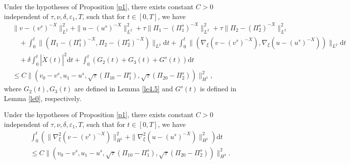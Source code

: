 \documentclass[10pt,a4paper]{amsart}
\newcommand{\dif}{\mathrm{d}}
\begin{document}
\begin{corollary} \label{coro111}
	Under the hypotheses of Proposition \ref{p1}, there exists constant $C>0$ independent of $\tau, \nu, \delta, \varepsilon_1, T$, such that for $t\in[0, T]$, we have
	\begin{equation}\label{hsgjcoll}
		\begin{aligned}
			&\|v-(v^s)^{-X}\|_{L^2}^2+\|u-(u^s)^{-X}\|_{L^2}^2
			+\tau\|\Pi_1-(\Pi_1^s)^{-X}\|_{L^2}^2
			+\tau\|\Pi_2-(\Pi_2^s)^{-X}\|_{L^2}^2\\
			&\quad
			+\int_0^t\|(\Pi_1-(\Pi_1^s)^{-X}, \Pi_2-(\Pi_2^s)^{-X})\|_{L^2}\dif t
			+\int_0^t\|(\nabla_\xi(v-(v^s)^{-X}), \nabla_\xi(u-(u^s)^{-X}))\|_{L^2}\dif t\\
			&\quad+\delta\int_0^t|\dot{X}(t)|^2
			\dif t+\int_0^t(G_2(t)+G_3(t)+G^s(t))
			\dif t\\
			&\le
			C\|(v_{0}-v^s, u_1-u^s,
			\sqrt{\tau}(\Pi_{10}-\Pi_1^s), \sqrt{\tau}(\Pi_{20}-\Pi_2^s))\|_{H^1}^2,
		\end{aligned}
	\end{equation}
	where $G_2(t), G_3(t)$ are defined in Lemma \ref{le4.5} and $G^s(t)$ is defined in Lemma \ref{le0}, respectively.
\end{corollary}

 \begin{lemma}\label{lehs3}
Under the hypotheses of Proposition \ref{p1}, there exists constant $C>0$ independent of $\tau, \nu, \delta, \varepsilon_1, T$, such that for $t\in[0, T]$, we have
\begin{equation}\label{hsgj1.3}
\begin{aligned}
&\int_0^t\left(\|\nabla^2_\xi(v-(v^s)^{-X})\|_{H^1}^2
 +\|\nabla^2_\xi(u-(u^s)^{-X})\|_{H^1}^2\right)\dif t\\&\le 	C\|(v_{0}-v^s, u_1-u^s,
\sqrt{\tau}(\Pi_{10}-\Pi_1^s), \sqrt{\tau}(\Pi_{20}-\Pi_2^s))\|_{H^3}^2.
\end{aligned}
\end{equation}
\end{lemma}
\end{document}
